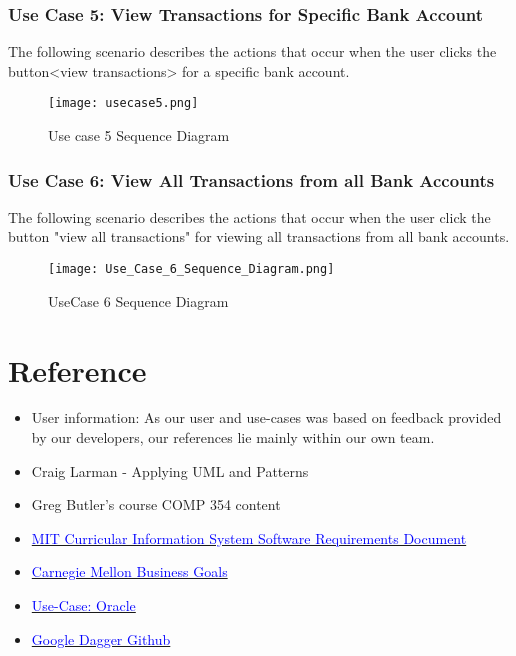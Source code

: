 \documentclass[12pt]{article}
\begin{document}
\clearpage

\subsubsection{Use Case 5: View Transactions for Specific Bank Account}

The following scenario describes the actions that occur when the user clicks the button<view transactions> for a specific bank account.

\begin{figure}[H]
\texttt{[image: usecase5.png]}
\caption{Use case 5 Sequence Diagram}
\label{fig:use-case-5-sequence-diagram}
\end{figure}

\clearpage

\clearpage

\subsubsection{Use Case 6: View All Transactions from all Bank Accounts}

The following scenario describes the actions that occur when the user click the button "view all transactions" for viewing all transactions from all bank accounts.

\begin{figure}[H]
\texttt{[image: Use\_Case\_6\_Sequence\_Diagram.png]}
\caption{UseCase 6 Sequence Diagram}
\label{fig:use-case-6-sequence-diagram}
\end{figure}

\clearpage

\section{Reference}

\begin{itemize}
\item User information: As our user and use-cases was based on feedback provided by our developers, our references lie mainly within our own team.
\item Craig Larman - Applying UML and Patterns
\item Greg Butler's course COMP 354 content
\item \href{http://web.mit.edu/ssit/cis/CISRequirements.html}{\textcolor{blue}{MIT Curricular Information System
Software Requirements Document}}
\item \href{https://resources.sei.cmu.edu/asset_files/TechnicalReport/2005_005_001_14621.pdf}{\textcolor{blue}{Carnegie Mellon Business Goals}}
\item \href{http://www.oracle.com/technetwork/testcontent/gettingstartedwithusecasemodeling-133857.pdf}{\textcolor{blue}{Use-Case: Oracle }}
\item \href{https://github.com/google/dagger}{\textcolor{blue}{Google Dagger Github}}

\end{itemize}
\end{document}
